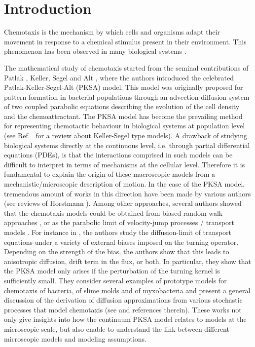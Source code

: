 \documentclass{aims} %
\theoremstyle{definition}
\begin{document}

\section{Introduction}

Chemotaxis is the mechanism by which cells and organisms adapt their movement in response to a chemical stimulus present in their environment. This phenomenon has been observed in many biological systems \cite{Alt1980,Jin2008,Kaupp2012,Roussos2011}. 

{The mathematical study of chemotaxis started from the seminal contributions of Patlak \cite{patlak1953random}, Keller, Segel and Alt \cite{Alt1980,keller1970initiation,keller1971model}, where the authors introduced the celebrated Patlak-Keller-Segel-Alt (PKSA) model. This model was originally proposed for pattern formation in bacterial populations through an advection-diffusion system of two coupled parabolic equations describing the evolution of the cell density and the chemoattractant. The PKSA model has become the prevailing method for representing chemotactic behaviour in biological systems at population level (see Ref.~\cite{Hillen2009} for a review about Keller-Segel type models). A drawback of studying biological systems directly at the continuous level, i.e. through partial differential equations (PDEs), is that the interactions comprised in such models can be difficult to interpret in terms of mechanisms at the cellular level. Therefore it is fundamental to explain the origin of these macroscopic models from a mechanistic/microscopic description of motion. In the case of the PKSA model, tremendous amount of works in this direction have been made by various authors (see reviews of Horstmann \cite{horstmann2003,horstmann2004}). Among other approaches, several authors showed that the chemotaxis models could be obtained from biased random walk approaches \cite{Alt1980, Othmer1997}, or as the parabolic limit of velocity-jump processes / transport models \cite{chalub2004kinetic,othmer2000diffusion,othmer2002diffusion}. For instance in \cite{othmer2002diffusion}, the authors study the diffusion-limit of transport equations under a variety of external biases imposed on the turning operator. Depending on the strength of the bias, the authors show that this leads to anisotropic diffusion, drift term in the flux, or both. In particular, they show that the PKSA model only arises if the perturbation of the turning kernel is sufficiently small. They consider several examples of prototype models for chemotaxis of bacteria, of slime molds and of myxobacteria and present a general discussion of the derivation of diffusion approximations from various stochastic processes that model chemotaxis (see \cite{othmer2000diffusion} and references therein). These works not only give insights into how the continuum PKSA model relates to models at the microscopic scale, but also enable to understand the link between different microscopic models and modeling assumptions.

}
\end{document}
